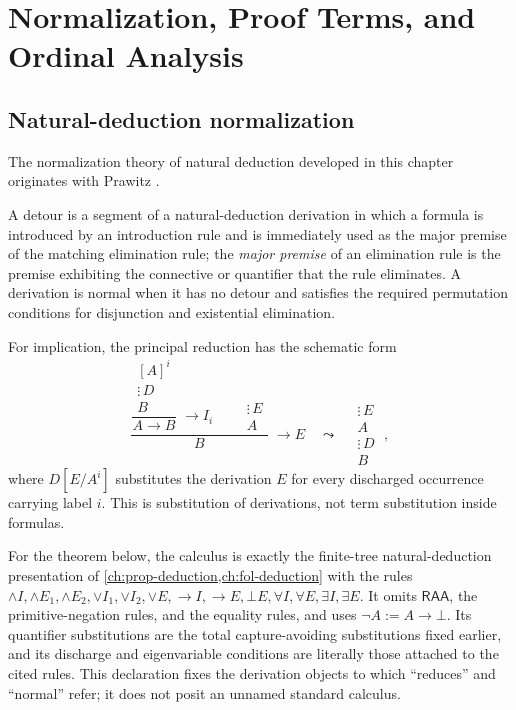 \documentclass[11pt,oneside,openany]{book}
\theoremstyle{definition}
\newtheorem{definition}{Definition}[chapter]
\theoremstyle{plain}
\theoremstyle{remark}
\let\LogicDefinition\definition
\let\endLogicDefinition\enddefinition
\renewenvironment{definition}[1][]{%
  \LogicDefinition[#1]%
  \if\relax\detokenize{#1}\relax\else\index{#1}\fi
}{\endLogicDefinition}
\newcommand{\bottom}{\bot}
\newcommand{\defeq}{\mathrel{:=}}
\begin{document}
\chapter[Normalization and Ordinal Analysis]{Normalization, Proof Terms, and Ordinal Analysis}
\label{ch:normalization-curry-howard}

\section{Natural-deduction normalization}
\label{sec:normalization-curry-howard-01}

The normalization theory of natural deduction developed in this chapter
originates with Prawitz \cite{Prawitz1965}.

\begin{definition}[Detour]
A detour is a segment of a natural-deduction derivation in which a formula is
introduced by an introduction rule and is immediately used as the major
premise of the matching elimination rule; the \emph{major premise} of an
elimination rule is the premise exhibiting the connective or quantifier
that the rule eliminates.  A derivation is normal when it has
no detour and satisfies the required permutation conditions for disjunction
and existential elimination.
\end{definition}

For implication, the principal reduction has the schematic form
\[
  \dfrac{
    \dfrac{\begin{matrix}{[A]}^i\\ \vdots\,D\\ B\end{matrix}}
          {A\to B}\;\to I_i
    \qquad
    \begin{matrix}\vdots\,E\\ A\end{matrix}
  }{B}\;\to E
  \quad\leadsto\quad
  \begin{matrix}\vdots\,E\\ A\\ \vdots\,D\\ B\end{matrix}\;,
\]
where \(D[E/A^i]\) substitutes the derivation \(E\) for every discharged
occurrence carrying label \(i\).  This is substitution of derivations, not term
substitution inside formulas.

For the theorem below, the calculus is exactly the finite-tree
natural-deduction presentation of \cref{ch:prop-deduction,ch:fol-deduction}
with the rules
\(\land I,\land E_1,\land E_2,\lor I_1,\lor I_2,\lor E,\to I,\to E,
\bottom E,\forall I,\forall E,\exists I,\exists E\).  It omits
\(\mathsf{RAA}\), the primitive-negation rules, and the equality rules, and
uses \(\neg A\defeq A\to\bottom\).  Its quantifier substitutions are the total
capture-avoiding substitutions fixed earlier, and its discharge and
eigenvariable conditions are literally those attached to the cited rules.
This declaration fixes the derivation objects to which ``reduces'' and
``normal'' refer; it does not posit an unnamed standard calculus.
\end{document}
